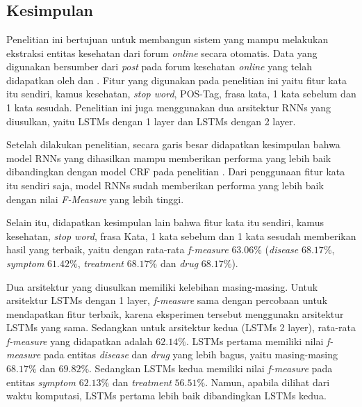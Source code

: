 \chapter{\babEnam}

\section{Kesimpulan}
Penelitian ini bertujuan untuk membangun sistem yang mampu melakukan ekstraksi entitas kesehatan dari forum \textit{online} secara otomatis. Data yang digunakan bersumber dari \textit{post} pada forum kesehatan \textit{online} yang telah didapatkan oleh \cite{skripsiKakRadit} dan \saya. Fitur yang digunakan pada penelitian ini yaitu fitur kata itu sendiri, kamus kesehatan, \textit{stop word}, POS-Tag, frasa kata,  1 kata sebelum dan 1 kata sesudah. Penelitian ini juga menggunakan dua arsitektur RNNs yang diusulkan, yaitu LSTMs dengan 1 layer dan LSTMs dengan 2 layer.

Setelah dilakukan penelitian, secara garis besar didapatkan kesimpulan bahwa model RNNs yang dihasilkan mampu memberikan performa yang lebih baik dibandingkan dengan model CRF pada penelitian \cite{skripsiKakRadit}. Dari penggunaan fitur kata itu sendiri saja, model RNNs sudah memberikan performa yang lebih baik dengan nilai \textit{F-Measure} yang lebih tinggi.

Selain itu, didapatkan kesimpulan lain bahwa fitur kata itu sendiri, kamus kesehatan, \textit{stop word}, frasa Kata,  1 kata sebelum dan 1 kata sesudah memberikan hasil yang terbaik, yaitu dengan rata-rata \textit{f-measure} $ 63.06\% $ (\textit{disease} $ 68.17\% $, \textit{symptom} $ 61.42\% $, \textit{treatment} $ 68.17\% $ dan \textit{drug} $ 68.17\% $).

Dua arsitektur yang diusulkan memiliki kelebihan masing-masing. Untuk arsitektur LSTMs dengan 1 layer, \textit{f-measure} sama dengan percobaan untuk mendapatkan fitur terbaik, karena eksperimen tersebut menggunakn arsitektur LSTMs yang sama. Sedangkan untuk arsitektur kedua (LSTMs 2 layer), rata-rata \textit{f-measure} yang didapatkan adalah $ 62.14\% $. LSTMs pertama memiliki nilai \textit{f-measure} pada entitas \textit{disease} dan \textit{drug} yang lebih bagus, yaitu masing-masing $ 68.17\% $ dan $ 69.82\% $. Sedangkan LSTMs kedua memiliki nilai \textit{f-measure} pada entitas \textit{symptom} $ 62.13\% $ dan \textit{treatment} $ 56.51\% $. Namun, apabila dilihat dari waktu komputasi, LSTMs pertama lebih baik dibandingkan LSTMs kedua.

